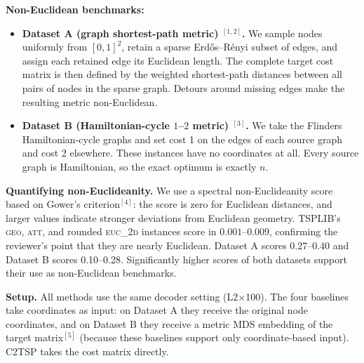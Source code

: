 \textbf{Non-Euclidean benchmarks:}

\begin{itemize}
    \item \textbf{Dataset A (graph shortest-path metric) $^{[1,2]}$.} We sample nodes uniformly from $[0,1]^2$, retain a sparse Erd\H{o}s--R\'enyi subset of edges, and assign each retained edge its Euclidean length. The complete target cost matrix is then defined by the weighted shortest-path distances between all pairs of nodes in the sparse graph. Detours around missing edges make the resulting metric non-Euclidean.

    \item \textbf{Dataset B (Hamiltonian-cycle $1$--$2$ metric) $^{[3]}$.} We take the Flinders Hamiltonian-cycle graphs and set cost 1 on the edges of each source graph and cost 2 elsewhere. These instances have no coordinates at all. Every source graph is Hamiltonian, so the exact optimum is exactly $n$. 
    
\end{itemize}

\textbf{Quantifying non-Euclideanity.} We use a spectral non-Euclideanity score based on Gower's criterion$^{[4]}$: the score is zero for Euclidean distances, and larger values indicate stronger deviations from Euclidean geometry. 
TSPLIB's \textsc{geo}, \textsc{att}, and rounded \textsc{euc\_2d} instances score in $0.001$--$0.009$, confirming the reviewer's point that they are nearly Euclidean. Dataset A scores 0.27--0.40 and Dataset B scores 0.10--0.28. Significantly higher scores of both datasets support their use as non-Euclidean benchmarks.


\textbf{Setup.} All methods use the same decoder setting (L2$\times$100). The four baselines take coordinates as input: on Dataset A they receive the original node coordinates, and on Dataset B they receive a metric MDS embedding of the target matrix$^{[5]}$ (because these baselines support only coordinate-based input). C2TSP takes the cost matrix directly. 


